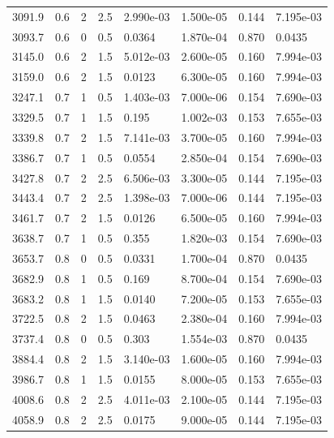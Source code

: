 \documentclass[preview]{standalone}
\begin{document}
{{{\begin{tabular}{L{1.2cm}C{1.2cm} C{0.3cm}C{0.5cm} C{1.4cm}C{1.4cm} C{1.4cm}C{1.4cm}}
  3091.9  &   0.6  & 2     & 2.5 &  2.990e-03  & 1.500e-05  & 0.144 &  7.195e-03   \\ 
  3093.7  &   0.6  & 0     & 0.5 &  0.0364  & 1.870e-04  & 0.870 &  0.0435   \\ 
  3145.0  &   0.6  & 2     & 1.5 &  5.012e-03  & 2.600e-05  & 0.160 &  7.994e-03   \\ 
  3159.0  &   0.6  & 2     & 1.5 &  0.0123  & 6.300e-05  & 0.160 &  7.994e-03   \\ 
  3247.1  &   0.7  & 1     & 0.5 &  1.403e-03  & 7.000e-06  & 0.154 &  7.690e-03   \\ 
  3329.5  &   0.7  & 1     & 1.5 &  0.195  & 1.002e-03  & 0.153 &  7.655e-03   \\ 
  3339.8  &   0.7  & 2     & 1.5 &  7.141e-03  & 3.700e-05  & 0.160 &  7.994e-03   \\ 
  3386.7  &   0.7  & 1     & 0.5 &  0.0554  & 2.850e-04  & 0.154 &  7.690e-03   \\ 
  3427.8  &   0.7  & 2     & 2.5 &  6.506e-03  & 3.300e-05  & 0.144 &  7.195e-03   \\ 
  3443.4  &   0.7  & 2     & 2.5 &  1.398e-03  & 7.000e-06  & 0.144 &  7.195e-03   \\ 
  3461.7  &   0.7  & 2     & 1.5 &  0.0126  & 6.500e-05  & 0.160 &  7.994e-03   \\ 
  3638.7  &   0.7  & 1     & 0.5 &  0.355  & 1.820e-03  & 0.154 &  7.690e-03   \\ 
  3653.7  &   0.8  & 0     & 0.5 &  0.0331  & 1.700e-04  & 0.870 &  0.0435   \\ 
  3682.9  &   0.8  & 1     & 0.5 &  0.169  & 8.700e-04  & 0.154 &  7.690e-03   \\ 
  3683.2  &   0.8  & 1     & 1.5 &  0.0140  & 7.200e-05  & 0.153 &  7.655e-03   \\ 
  3722.5  &   0.8  & 2     & 1.5 &  0.0463  & 2.380e-04  & 0.160 &  7.994e-03   \\ 
  3737.4  &   0.8  & 0     & 0.5 &  0.303  & 1.554e-03  & 0.870 &  0.0435   \\ 
  3884.4  &   0.8  & 2     & 1.5 &  3.140e-03  & 1.600e-05  & 0.160 &  7.994e-03   \\ 
  3986.7  &   0.8  & 1     & 1.5 &  0.0155  & 8.000e-05  & 0.153 &  7.655e-03   \\ 
  4008.6  &   0.8  & 2     & 2.5 &  4.011e-03  & 2.100e-05  & 0.144 &  7.195e-03   \\ 
  4058.9  &   0.8  & 2     & 2.5 &  0.0175  & 9.000e-05  & 0.144 &  7.195e-03   \\ 

\end{tabular}}}}
\end{document}
